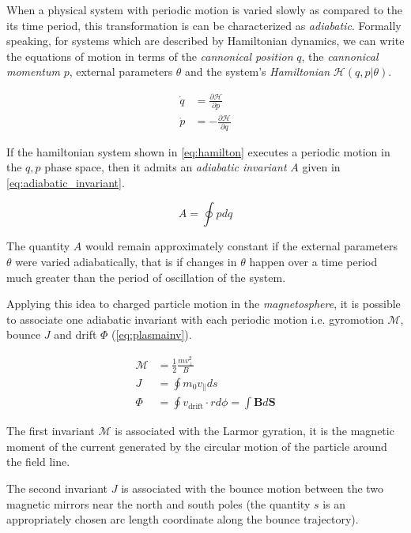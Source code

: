 When a physical system with periodic motion is varied slowly as compared to the its time period, this 
transformation is can be characterized as \emph{adiabatic}. Formally speaking, for systems which are described by 
Hamiltonian dynamics, we can write the equations of motion in terms of the \emph{cannonical position} $q$, 
the \emph{cannonical momentum} $p$, external parameters $\theta$ and the system's \emph{Hamiltonian} 
$\mathcal{H}(q,p|\theta)$. 

\begin{align}\label{eq:hamilton}
    \dot q &= \frac{\partial \mathcal{H}}{\partial p}\\
    \dot p &= - \frac{\partial \mathcal{H}}{\partial q}
\end{align}

If the hamiltonian system shown in \cref{eq:hamilton} executes a periodic motion in the $q,p$ phase space, 
then it admits an \emph{adiabatic invariant} $A$ given in \cref{eq:adiabatic_invariant}.

\begin{equation}\label{eq:adiabatic_invariant}
    A = \oint p dq
\end{equation}

The quantity $A$ would remain approximately constant if the external parameters $\theta$ were varied adiabatically, 
that is if changes in $\theta$ happen over a time period much greater than the period of oscillation of the system.

Applying this idea to charged particle motion in the \emph{magnetosphere}, it is possible to associate one 
adiabatic invariant with each periodic motion i.e. gyromotion $\mathcal{M}$, bounce $J$ and drift 
$\Phi$ (\cref{eq:plasmainv}). 

\begin{align}\label{eq:plasmainv}
    \mathcal{M} &= \frac{1}{2}\frac{mv^{2}_{\perp}}{B} \\
    J &= \oint{m_0 v_{\parallel}ds} \\
    \Phi &= \oint{v_{\text{drift}} \cdot r d\phi} = \int{\mathbf{B} d\mathbf{S}}
\end{align}


The first invariant $\mathcal{M}$ is associated with the Larmor gyration, it is the magnetic moment of the 
current generated by the circular motion of the particle around the field line. 

The second invariant $J$ is associated with the bounce motion between the two magnetic mirrors near the north and 
south poles (the quantity $s$ is an appropriately chosen arc length coordinate along the bounce trajectory). 

